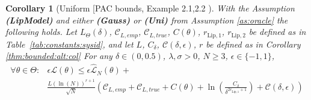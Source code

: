\documentclass{article}
\newtheorem{corollary}[theorem]{Corollary}
\newtheorem{assumption}[theorem]{Assumption}
\begin{document}
 \begin{corollary}[Uniform [PAC bounds, Example 2.1,2.2 \cite{alquier2021userfriendly}]
 \label{lem:pac}
  With the Assumption  \textbf{(LipModel)} and either 
\textbf{(Gauss)} or \textbf{(Uni)} from Assumption \ref{as:oracle} the following holds.
  Let $L_{\Theta}(\delta)$, $\mathcal{C}_{L,emp}$, $\mathcal{C}_{L,true}$, $C(\theta)$,  $r_{\text{Lip},1}$, $r_{\text{Lip},2}$
   be defined as in 
   Table~\ref{tab:constants:sysid},
   and let 
   $L$, $C_{\delta}$, %
   $\mathcal{C}(\delta,\epsilon)$, $r$  be defined as in 
   Corollary \ref{thm:bounded:alt:col}
   For any $\delta \in (0,0.5)$, $\lambda,\sigma  > 0
   $, $N\geq 3$, %
   $\epsilon \in \{-1,1\}$, 
   \begin{equation}
   \label{lem:pac:eq1:uniform}
   \begin{aligned}
     \forall \theta \in \Theta: &
    \epsilon \mathcal{L}(\theta)  \le 
    \epsilon \hat{\mathcal{L}}_{N}(\theta) + \\
     & \frac{L(\ln(N))^{r+1}}{\sqrt{N}} \left(\mathcal{C}_{L,emp}+\mathcal{C}_{L,true}+C(\theta)+\ln \left(\frac{C_{\delta}}{\delta^{2r_{\text{Lip},1}+1}}\right) + \mathcal{C}(\delta,\epsilon)\right)

\end{aligned}
\end{equation}
\end{corollary}
\end{document}
